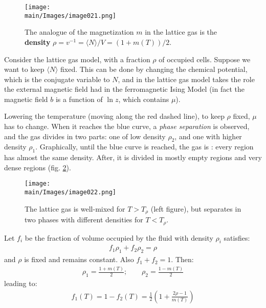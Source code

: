 \documentclass[../../main.tex]{subfiles}
\begin{document}
\begin{figure}[H]
    \centering
    \texttt{[image: \\main/Images/image021.png]}
    \caption{The analogue of the magnetization $m$ in the lattice gas is the \textbf{density} $\rho = v^{-1} = \langle N \rangle /V = (1+m(T))/2$. \label{fig:lattice-critical}} %
\end{figure}

Consider the lattice gas model, with a fraction $\rho$ of occupied cells. Suppose we want to keep $\langle N \rangle$ fixed. This can be done by changing the chemical potential, which is the conjugate variable to $N$, and in the lattice gas model takes the role the external magnetic field had in the ferromagnetic Ising Model (in fact the magnetic field $b$ is a function of $\ln z$, which contains $\mu$).

Lowering the temperature (moving along the red dashed line), to keep $\rho$ fixed, $\mu$ has to change. When it reaches the blue curve, a \textit{phase separation} is observed, and the gas divides in two parts: one of low density $\rho_2$, and one with higher density $\rho_1$. Graphically, until the blue curve is reached, the gas is : every region has almost the same density. After, it is divided in mostly empty regions and very dense regions (fig. \ref{fig:fluid-sep}).

\begin{figure}[H]
    \centering
    \texttt{[image: \\main/Images/image022.png]}
    \caption{The lattice gas is well-mixed for $T > T_\rho$ (left figure), but separates in two phases with different densities for $T < T_\rho$.\label{fig:fluid-sep}}
\end{figure}

Let $f_i$ be the fraction of volume occupied by the fluid with density $\rho_i$ satisfies:
\begin{align*}
    f_1 \rho_1 + f_2 \rho_2 = \rho
\end{align*}
and $\rho$ is fixed and remains constant. Also $f_1 + f_2 = 1$. Then:
\begin{align*}
    \rho_1 = \frac{1+m(T)}{2}; \qquad \rho_2 = \frac{1-m(T)}{2}  
\end{align*}
leading to:
\begin{align*}
    f_1(T) = 1-f_2(T) = \frac{1}{2} \left(1+\frac{2 \rho -1}{m(T)} \right) 
\end{align*}
\end{document}
